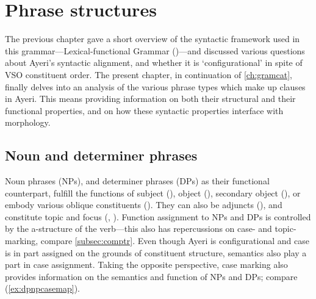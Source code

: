 
\chapter{Phrase structures}
\label{ch:phrasestruct}

The previous chapter gave a short overview of the syntactic framework used in
this grammar---Lexical-functional Grammar (\Lfg{})---and discussed various
questions about Ayeri's syntactic alignment, and whether it is `configurational'
in spite of VSO constituent order. The present chapter,
in continuation of \autoref{ch:gramcat}, finally delves into an analysis of the
various phrase types which make up clauses in Ayeri. This means providing
information on both their structural and their functional properties, and on how
these syntactic properties interface with morphology.

\section{Noun and determiner phrases}
\label{sec:nps-dps}

Noun phrases (NPs), and determiner phrases (DPs) as their functional counterpart, fulfill the functions of
subject (\Subj{}), object (\Obj{}), secondary object (\SObj{}), or embody various
oblique constituents (\Oblique). They can
also be adjuncts (\Adjc{}), and constitute
topic and focus (\Top{}, \Foc{}). Function assignment to NPs and DPs is
controlled by the a-structure of the verb---this also has
repercussions on case- and topic-marking, compare \autoref{subsec:comptr}. Even
though Ayeri is configurational and case is in part assigned on the
grounds of constituent structure, semantics also play a part in case
assignment. Taking the opposite perspective, case marking also
provides information on the semantics and function of NPs and DPs; compare (\ref{ex:dpnpcasemap}).

